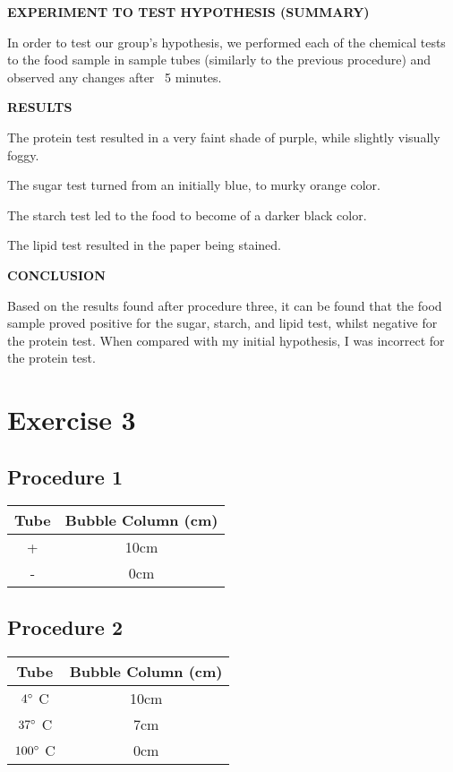 \documentclass{article}
\begin{document}
\textbf{EXPERIMENT TO TEST HYPOTHESIS (SUMMARY)}

In order to test our group's hypothesis, we performed each of the chemical tests to the food sample in sample tubes (similarly to the previous procedure) and observed any changes after ~5 minutes.

\textbf{RESULTS}

The protein test resulted in a very faint shade of purple, while slightly visually foggy.

The sugar test turned from an initially blue, to murky orange color.

The starch test led to the food to become of a darker black color.

The lipid test resulted in the paper being stained.

\textbf{CONCLUSION}

Based on the results found after procedure three, it can be found that the food sample proved positive for the sugar, starch, and lipid test, whilst negative for the protein test. When compared with my initial hypothesis, I was incorrect for the protein test.

\section{Exercise 3}

\subsection{Procedure 1}

\begin{tabular}{ | c | c | }
    \textbf{Tube} & \textbf{Bubble Column (cm)} \\
    \hline
    + & 10cm \\
    - & 0cm
\end{tabular}

\subsection{Procedure 2}

\begin{tabular}{ | c | c | }
    \textbf{Tube} & \textbf{Bubble Column (cm)} \\
    \hline
    $ 4\degree $ C & 10cm \\
    $ 37\degree $ C & 7cm \\
    $ 100\degree $ C & 0cm
\end{tabular}
\end{document}
